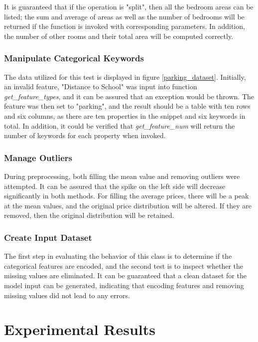\documentclass[12pt,twoside]{report}
\begin{document}
It is guaranteed that if the operation is  "split", then all the bedroom areas can be listed; the sum and average of areas as well as the number of bedrooms will be returned if the function is invoked with corresponding parameters. In addition, the number of other rooms and their total area will be computed correctly. 

\subsection{Manipulate Categorical Keywords}
The data utilized for this test is displayed in figure \ref{parking_dataset}. Initially, an invalid feature, "Distance to School" was input into function \textit{get\_feature\_types}, and it can be assured that an exception would be thrown. The feature was then set to "parking", and the result should be a table with ten rows and six columns, as there are ten properties in the snippet and six keywords in total. In addition, it could be verified that \textit{get\_feature\_num} will return the number of keywords for each property when invoked.

\subsection{Manage Outliers}
During preprocessing, both filling the mean value and removing outliers were attempted. It can be assured that the spike on the left side will decrease significantly in both methods. For filling the average prices, there will be a peak at the mean values, and the original price distribution will be altered. If they are removed, then the original distribution will be retained. 

\subsection{Create Input Dataset}
The first step in evaluating the behavior of this class is to determine if the categorical features are encoded, and the second test is to inspect whether the missing values are eliminated. It can be guaranteed that a clean dataset for the model input can be generated, indicating that encoding features and removing missing values did not lead to any errors. 

\chapter{Experimental Results}
\end{document}

